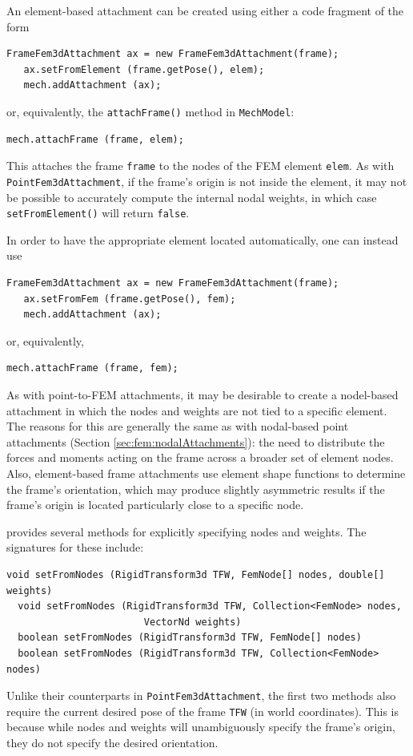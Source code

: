 An element-based attachment can be created using either a code fragment
of the form
%
\begin{lstlisting}[]
   FrameFem3dAttachment ax = new FrameFem3dAttachment(frame);
   ax.setFromElement (frame.getPose(), elem);
   mech.addAttachment (ax);
\end{lstlisting}
%
or, equivalently, the {\tt attachFrame()} method in {\tt MechModel}:
%
\begin{lstlisting}[]
   mech.attachFrame (frame, elem);
\end{lstlisting}
%
This attaches the frame {\tt frame} to the nodes of the FEM element
{\tt elem}. As with {\tt PointFem3dAttachment}, if the frame's origin
is not inside the element, it may not be possible to accurately
compute the internal nodal weights, in which case {\tt
setFromElement()} will return {\tt false}.

In order to have the appropriate element located automatically,
one can instead use
%
\begin{lstlisting}[]
   FrameFem3dAttachment ax = new FrameFem3dAttachment(frame);
   ax.setFromFem (frame.getPose(), fem);
   mech.addAttachment (ax);
\end{lstlisting}
%
or, equivalently, 
%
\begin{lstlisting}[]
   mech.attachFrame (frame, fem);
\end{lstlisting}
%

As with point-to-FEM attachments, it may be desirable to create a
nodel-based attachment in which the nodes and weights are not tied to
a specific element. The reasons for this are generally the same as
with nodal-based point attachments (Section
\ref{sec:fem:nodalAttachments}): the need to distribute the forces and
moments acting on the frame across a broader set of element nodes.
Also, element-based frame attachments use element shape functions to
determine the frame's orientation, which may produce slightly
asymmetric results if the frame's origin is located particularly close
to a specific node.

 provides
several methods for explicitly specifying nodes and weights. The
signatures for these include:
\begin{lstlisting}[]
  void setFromNodes (RigidTransform3d TFW, FemNode[] nodes, double[] weights)
  void setFromNodes (RigidTransform3d TFW, Collection<FemNode> nodes, 
                        VectorNd weights)
  boolean setFromNodes (RigidTransform3d TFW, FemNode[] nodes)
  boolean setFromNodes (RigidTransform3d TFW, Collection<FemNode> nodes)
\end{lstlisting}
Unlike their counterparts in {\tt PointFem3dAttachment}, the first two
methods also require the current desired pose of the frame {\tt TFW}
(in world coordinates).  This is because while nodes and weights will
unambiguously specify the frame's origin, they do not specify the
desired orientation.

